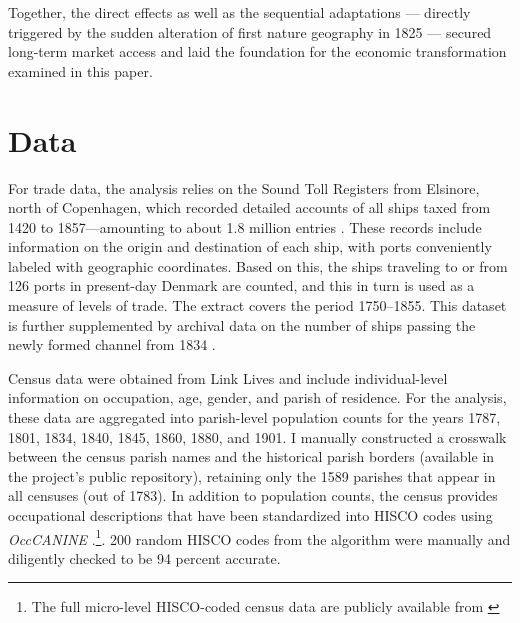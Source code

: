 \documentclass[12pt]{article}
\begin{document}
Together, the direct effects as well as the sequential adaptations — directly triggered by the sudden alteration of first nature geography in 1825 — secured long-term market access and laid the foundation for the economic transformation examined in this paper.

\section{Data}

For trade data, the analysis relies on the Sound Toll Registers from Elsinore, north of Copenhagen, which recorded detailed accounts of all ships taxed from 1420 to 1857—amounting to about 1.8 million entries \citep{gobel2010oresundstolden, soundtoll_data}. These records include information on the origin and destination of each ship, with ports conveniently labeled with geographic coordinates. Based on this, the ships traveling to or from 126 ports in present-day Denmark are counted, and this in turn is used as a measure of levels of trade. The extract covers the period 1750–1855. This dataset is further supplemented by archival data on the number of ships passing the newly formed channel from 1834 \citep{Svalgaard1977}.

Census data were obtained from Link Lives \citep{mathiesen2022linklives} and include individual-level information on occupation, age, gender, and parish of residence. For the analysis, these data are aggregated into parish-level population counts for the years 1787, 1801, 1834, 1840, 1845, 1860, 1880, and 1901. I manually constructed a crosswalk between the census parish names and the historical parish borders (available in the project's public repository), retaining only the 1589 parishes that appear in all censuses (out of 1783). In addition to population counts, the census provides occupational descriptions that have been standardized into HISCO codes using \textit{OccCANINE} \citep{dahl2024breaking}.\footnote{The full micro-level HISCO-coded census data are publicly available from \citep{dk_hisco_data}}. 200 random HISCO codes from the algorithm were manually and diligently checked to be 94 percent accurate.
\end{document}
